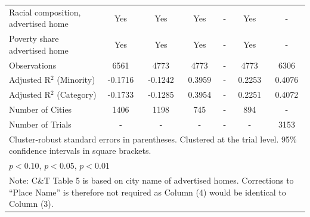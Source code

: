 \begin{table}[htbp]
{\begin{tabular}{l*{6}{c}}
Racial composition, advertised home & Yes & Yes & Yes & - & Yes & - \\
Poverty share advertised home & Yes & Yes & Yes & - & Yes & - \\
Observations & 6561 & 4773 & 4773 & - & 4773 & 6306 \\
Adjusted R$^2$ (Minority) & -0.1716 & -0.1242 & 0.3959 & - & 0.2253 & 0.4076 \\
Adjusted R$^2$ (Category) & -0.1733 & -0.1285 & 0.3954 & - & 0.2251 & 0.4072 \\
Number of Cities & 1406 & 1198 & 745 & - & 894 & - \\
Number of Trials & - & - & - & - & - & 3153 \\
\bottomrule
\multicolumn{7}{l}{\footnotesize Cluster-robust standard errors in parentheses. Clustered at the trial level. 95\% confidence intervals in square brackets.}\\
\multicolumn{7}{l}{\footnotesize \sym{*} \(p<0.10\), \sym{**} \(p<0.05\), \sym{***} \(p<0.01\)}\\
\multicolumn{7}{l}{\footnotesize Note: C\&T Table 5 is based on city name of advertised homes. Corrections to ``Place Name'' is therefore not required as Column (4) would be identical to Column (3).}
\end{tabular}
}
\end{table}
